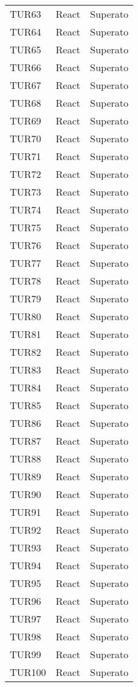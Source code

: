 \documentclass[PianoDiQualifica.tex]{subfiles}
\begin{document}
\begin{longtable}[H]{P{2cm}P{8.5cm}P{3cm}}
	TUR63 & React & Superato \\ 
	TUR64 & React & Superato \\ 
	TUR65 & React & Superato \\ 
	TUR66 & React & Superato \\ 
	TUR67 & React & Superato \\ 
	TUR68 & React & Superato \\ 
	TUR69 & React & Superato \\ 
	TUR70 & React & Superato \\ 
	TUR71 & React & Superato \\ 
	TUR72 & React & Superato \\ 
	TUR73 & React & Superato \\ 
	TUR74 & React & Superato \\ 
	TUR75 & React & Superato \\ 
	TUR76 & React & Superato \\ 
	TUR77 & React & Superato \\ 
	TUR78 & React & Superato \\ 
	TUR79 & React & Superato \\ 
	TUR80 & React & Superato \\ 
	TUR81 & React & Superato \\ 
	TUR82 & React & Superato \\ 
	TUR83 & React & Superato \\ 
	TUR84 & React & Superato \\ 
	TUR85 & React & Superato \\ 
	TUR86 & React & Superato \\ 
	TUR87 & React & Superato \\ 
	TUR88 & React & Superato \\ 
	TUR89 & React & Superato \\ 
	TUR90 & React & Superato \\ 
	TUR91 & React & Superato \\ 
	TUR92 & React & Superato \\ 
	TUR93 & React & Superato \\ 
	TUR94 & React & Superato \\ 
	TUR95 & React & Superato \\ 
	TUR96 & React & Superato \\ 
	TUR97 & React & Superato \\ 
	TUR98 & React & Superato \\ 
	TUR99 & React & Superato \\ 
	TUR100 & React & Superato \\ 

\end{longtable}
\end{document}
